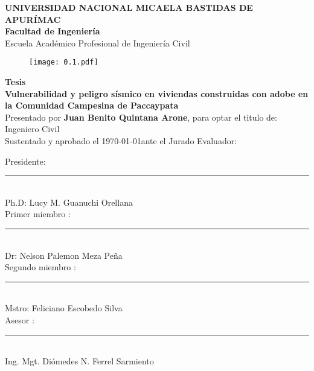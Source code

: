 \begin{titlepage}
	\begin{center}
		\textbf{\large{UNIVERSIDAD NACIONAL MICAELA BASTIDAS DE APURÍMAC}}\\
		\textbf{\large{Facultad de Ingeniería}\\}
		\large{Escuela Académico Profesional de Ingeniería Civil}\\
		\vspace{2mm}
		\begin{figure}[h!]
			\centering
			\texttt{[image: 0.1.pdf]}
		\end{figure}
		\textbf{Tesis}\\
		\vspace{2mm} 
		\textbf{Vulnerabilidad y peligro sísmico en viviendas construidas con adobe en la Comunidad Campesina de Paccaypata}\\
		Presentado por \textbf{Juan Benito Quintana Arone}, para optar el titulo de: Ingeniero Civil \\
Sustentado y aprobado el \today \hspace{2mm}ante el Jurado Evaluador:
\vspace{7mm}%
		\begin{center}
			Presidente: \hfill \rule{9cm}{0.4pt}\\
			\hspace{7cm} {\sffamily Ph.D: Lucy M. Guanuchi Orellana} \\
			\vspace{7mm}
			Primer miembro	:\hfill \rule{9cm}{0.4pt}\\
			\hspace{7cm} {\sffamily Dr: Nelson Palemon Meza Peña} \\		
			\vspace{7mm}
			Segundo miembro	:\hfill \rule{9cm}{0.4pt}\\
			\hspace{7cm} {\sffamily Mstro: Feliciano Escobedo Silva} \\		
			\vspace{7mm}
			\large Asesor	: \hfill \rule{9cm}{0.4pt}\\	
			\hspace{7cm} { Ing. Mgt. Diómedes N. Ferrel Sarmiento} \\	
		\end{center}
		
		\vfill
		
	\end{center}
\end{titlepage}